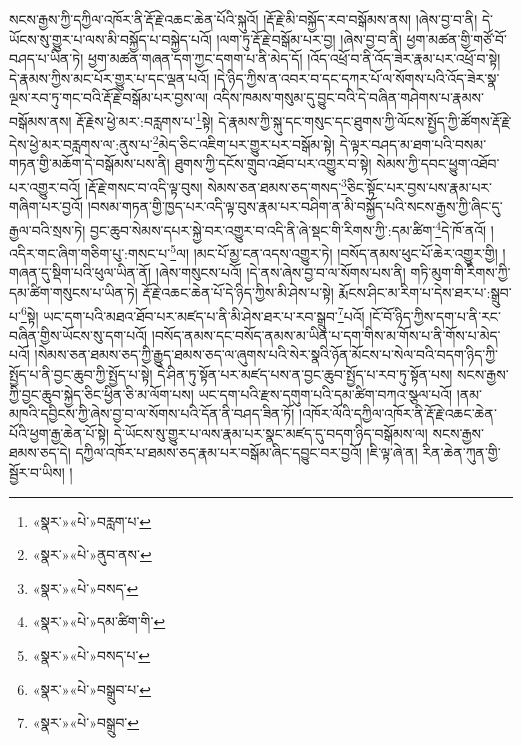 སངས་རྒྱས་ཀྱི་དཀྱིལ་འཁོར་ནི་རྡོ་རྗེ་འཆང་ཆེན་པོའི་སྐུའོ། །རྡོ་རྗེ་མི་བསྐྱོད་རབ་བསྒོམས་ནས། །ཞེས་བྱ་བ་ནི། དེ་ཡོངས་སུ་གྱུར་པ་ལས་མི་བསྐྱོད་པ་བསྐྱེད་པའོ། །ལག་ཏུ་རྡོ་རྗེ་བསྒོམ་པར་བྱ། །ཞེས་བྱ་བ་ནི། ཕྱག་མཚན་གྱི་གཙོ་བོ་བཤད་པ་ཡིན་ཏེ། ཕྱག་མཚན་གཞན་དག་ཀྱང་དགག་པ་ནི་མེད་དོ། །འོད་འཕྲོ་བ་ནི་འོད་ཟེར་རྣམ་པར་འཕྲོ་བ་སྟེ། དེ་རྣམས་ཀྱིས་མང་པོར་གྱུར་པ་དང་ལྡན་པའོ། །དེ་ཉིད་ཀྱིས་ན་འབར་བ་དང་དཀར་པོ་ལ་སོགས་པའི་འོད་ཟེར་སྣ་ལྔས་རབ་ཏུ་གང་བའི་རྡོ་རྗེ་བསྒོམ་པར་བྱས་ལ། འདིས་ཁམས་གསུམ་དུ་བྱུང་བའི་དེ་བཞིན་གཤེགས་པ་རྣམས་བསྒོམས་ནས། རྡོ་རྗེས་ཕྱེ་མར་:བརླགས་པ་\footnote{«སྣར་»«པེ་»བརླག་པ་}སྟེ། དེ་རྣམས་ཀྱི་སྐུ་དང་གསུང་དང་ཐུགས་ཀྱི་ལོངས་སྤྱོད་ཀྱི་ཚོགས་རྡོ་རྗེ་དེས་ཕྱེ་མར་བརླགས་ལ་:ནུས་པ་\footnote{«སྣར་»«པེ་»ནུབ་ནས་}མེད་ཅིང་འཇིག་པར་གྱུར་པར་བསྒོམ་སྟེ། དེ་ལྟར་བཤད་མ་ཐག་པའི་བསམ་གཏན་གྱི་མཆོག་དེ་བསྒོམས་པས་ནི། ཐུགས་ཀྱི་དངོས་གྲུབ་འཐོབ་པར་འགྱུར་བ་སྟེ། སེམས་ཀྱི་དབང་ཕྱུག་འཐོབ་པར་འགྱུར་བའོ། །རྡོ་རྗེ་གསང་བ་འདི་ལྟ་བུས། སེམས་ཅན་ཐམས་ཅད་གསད་\footnote{«སྣར་»«པེ་»བསད་}ཅིང་སྟོང་པར་བྱས་པས་རྣམ་པར་གཞིག་པར་བྱའོ། །བསམ་གཏན་གྱི་ཁྱད་པར་འདི་ལྟ་བུས་རྣམ་པར་བཤིག་ན་མི་བསྐྱོད་པའི་སངས་རྒྱས་ཀྱི་ཞིང་དུ་རྒྱལ་བའི་སྲས་ཏེ། བྱང་ཆུབ་སེམས་དཔར་སྐྱེ་བར་འགྱུར་བ་འདི་ནི་ཞེ་སྡང་གི་རིགས་ཀྱི་:དམ་ཚིག་\footnote{«སྣར་»«པེ་»དམ་ཚིག་གི་}དེ་ཁོ་ནའོ། །འདིར་གང་ཞིག་གཅིག་པུ་:གསང་པ་\footnote{«སྣར་»«པེ་»བསད་པ་}ལ། །མང་པོ་མྱ་ངན་འདས་འགྱུར་ཏེ། །བསོད་ནམས་ཕུང་པོ་ཆེར་འགྱུར་གྱི། །གཞན་དུ་སྡིག་པའི་ཕུལ་ཡིན་ནོ། །ཞེས་གསུངས་པའོ། །དེ་ནས་ཞེས་བྱ་བ་ལ་སོགས་པས་ནི། གཏི་མུག་གི་རིགས་ཀྱི་དམ་ཚིག་གསུངས་པ་ཡིན་ཏེ། རྡོ་རྗེ་འཆང་ཆེན་པོ་དེ་ཉིད་ཀྱིས་མི་ཤེས་པ་སྟེ། རྨོངས་ཤིང་མ་རིག་པ་དེས་ཐར་པ་:སྒྲུབ་པ་\footnote{«སྣར་»«པེ་»བསྒྲུབ་པ་}སྟེ། ཡང་དག་པའི་མཐའ་ཐོབ་པར་མཛད་པ་ནི་མི་ཤེས་ཐར་པ་རབ་སྒྲུབ་\footnote{«སྣར་»«པེ་»བསྒྲུབ་}པའོ། །ངོ་བོ་ཉིད་ཀྱིས་དག་པ་ནི་རང་བཞིན་གྱིས་ཡོངས་སུ་དག་པའོ། །བསོད་ནམས་དང་བསོད་ནམས་མ་ཡིན་པ་དག་གིས་མ་གོས་པ་ནི་གོས་པ་མེད་པའོ། །སེམས་ཅན་ཐམས་ཅད་ཀྱི་རྒྱུད་ཐམས་ཅད་ལ་ཞུགས་པའི་སེར་སྣའི་ཉོན་མོངས་པ་སེལ་བའི་བདག་ཉིད་ཀྱི་སྤྱོད་པ་ནི་བྱང་ཆུབ་ཀྱི་སྤྱོད་པ་སྟེ། དེ་ཤིན་ཏུ་སྟོན་པར་མཛད་པས་ན་བྱང་ཆུབ་སྤྱོད་པ་རབ་ཏུ་སྟོན་པས། སངས་རྒྱས་ཀྱི་བྱང་ཆུབ་སྐྱེད་ཅིང་ཕྱིན་ཅི་མ་ལོག་པས། ཡང་དག་པའི་རྫས་དགུག་པའི་དམ་ཚིག་བཀའ་སྩལ་པའོ། །ནམ་མཁའི་དབྱིངས་ཀྱི་ཞེས་བྱ་བ་ལ་སོགས་པའི་དོན་ནི་བཤད་ཟིན་ཏོ། །འཁོར་ལོའི་དཀྱིལ་འཁོར་ནི་རྡོ་རྗེ་འཆང་ཆེན་པོའི་ཕྱག་རྒྱ་ཆེན་པོ་སྟེ། དེ་ཡོངས་སུ་གྱུར་པ་ལས་རྣམ་པར་སྣང་མཛད་དུ་བདག་ཉིད་བསྒོམས་ལ། སངས་རྒྱས་ཐམས་ཅད་དེ། དཀྱིལ་འཁོར་པ་ཐམས་ཅད་རྣམ་པར་བསྒོམ་ཞིང་དབྱུང་བར་བྱའོ། །ཇི་ལྟ་ཞེ་ན། རིན་ཆེན་ཀུན་གྱི་སྦྱོར་བ་ཡིས། །
